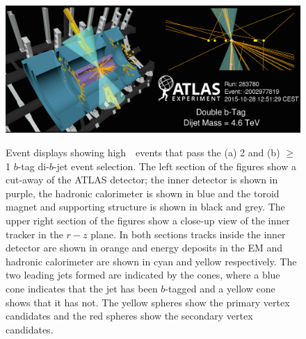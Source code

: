\begin{figure}[!ht]
  \begin{center}
    \captionsetup[subfigure]{aboveskip=0pt,justification=centering}
          {\includegraphics[width=0.95\linewidth, angle=0]{figs/Dibjet/Gen/evt-vp1_bb.png}}\\
  \end{center}
  \caption
      {Event displays showing high~\mjj~events that pass the (a) 2 and (b) $\geq$1 $b$-tag di-$b$-jet event selection.
        The left section of the figures show a cut-away of the ATLAS detector;
        the inner detector is shown in purple, the hadronic calorimeter is shown in blue
        and the toroid magnet and supporting structure is shown in black and grey.
        The upper right section of the figures show a close-up view of the inner tracker in the $r-z$ plane.
        In both sections tracks inside the inner detector are shown in orange
        and energy deposits in the EM and hadronic calorimeter are shown in cyan and yellow respectively.
        The two leading jets formed are indicated by the cones, where a blue cone indicates that the jet has been
        $b$-tagged and a yellow cone shows that it has not.
        The yellow spheres show the primary vertex candidates and the red spheres show the secondary vertex candidates.
      }
  \label{fig:evt-vp1}
\end{figure}

